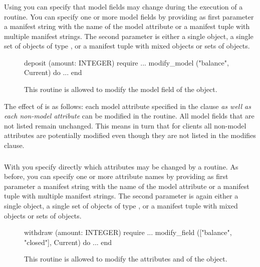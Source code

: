 \subsubsection*{}

Using  you can specify that model fields may change during the execution of a routine. You can specify one or more model fields by providing as first parameter a manifest string with the name of the model attribute or a manifest tuple with multiple manifest strings. The second parameter is either a single object, a single set of objects of type , or a manifest tuple with mixed objects or sets of objects.

\begin{figure}
\begin{erunning}
deposit (amount: INTEGER)
	require
		...
		modify_model ("balance", Current)
	do ... end
\end{erunning}
\hspace{0.5cm}
\caption*{This routine is allowed to modify the model field  of the  object.}
\end{figure}

The effect of  is as follows: each model attribute specified in the  clause \emph{as well as each non-model attribute} can be modified in the routine. All model fields that are not listed remain unchanged. This means in turn that for clients all non-model attributes are potentially modified even though they are not listed in the modifies clause.

\subsubsection*{}

With  you specify directly which attributes may be changed by a routine. As before,
you can specify one or more attribute names by providing as first parameter a manifest string with the name of the model attribute or a manifest tuple with multiple manifest strings. The second parameter is again either a single object, a single set of objects of type , or a manifest tuple with mixed objects or sets of objects.

\begin{figure}
\begin{erunning}
withdraw (amount: INTEGER)
	require
		...
		modify_field (["balance", "closed"], Current)
	do ... end
\end{erunning}
\hspace{0.5cm}
\caption*{This routine is allowed to modify the attributes  and  of the  object.}
\end{figure}

